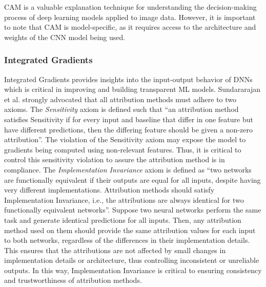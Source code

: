 \documentclass[final,5p,times,twocolumn]{elsarticle}
\begin{document}
CAM is a valuable explanation technique for understanding the decision-making process of deep learning models applied to image data. However, it is important to note that CAM is model-specific, as it requires access to the architecture and weights of the CNN model being used. 

\subsubsection{Integrated Gradients}
 Integrated Gradients \cite{sundararajan2017axiomatic} provides insights into the input-output behavior of DNNs which is critical in improving and building transparent ML models. Sundararajan et al. \cite{sundararajan2017axiomatic} strongly advocated that all attribution methods must adhere to two axioms. 
The \textit{Sensitivity} axiom is defined such that ``an attribution method satisfies Sensitivity if for every input and baseline that differ in one feature but have different predictions, then the differing feature should be given a non-zero attribution''. The violation of the Sensitivity axiom may expose the model to gradients being computed using non-relevant features. Thus, it is critical to control this sensitivity violation to assure the attribution method is in compliance. The \textit{Implementation Invariance} axiom is defined as ``two networks are functionally equivalent if their outputs are equal for all inputs, despite having very different implementations. Attribution methods should satisfy Implementation Invariance, i.e., the attributions are always identical for two functionally equivalent networks''. Suppose two neural networks perform the same task and generate identical predictions for all inputs. Then, any attribution method used on them should provide the same attribution values for each input to both networks, regardless of the differences in their implementation details. This ensures that the attributions are not affected by small changes in implementation details or architecture, thus controlling inconsistent or unreliable outputs. In this way, Implementation Invariance is critical to ensuring consistency and trustworthiness of attribution methods.
\end{document}

